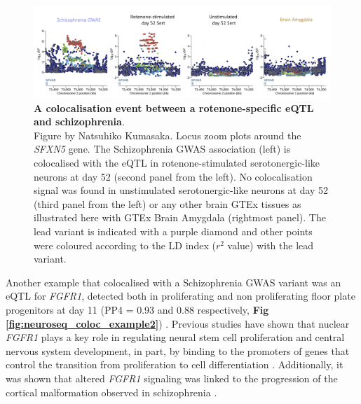 \begin{figure}[h]
\centering
\includegraphics[width=15.5cm]{Chapter5/Fig/neuroseq_coloc_example1_SFXN5.png}
\caption[First example of colocalisation]{\textbf{A colocalisation event between a rotenone-specific eQTL and schizophrenia}.\\
Figure by Natsuhiko Kumasaka. Locus zoom plots around the \textit{SFXN5} gene. 
The Schizophrenia GWAS association (left) is colocalised with the eQTL in rotenone-stimulated serotonergic-like neurons at day 52 (second panel from the left). 
No colocalisation signal was found in unstimulated serotonergic-like neurons at day 52 (third panel from the left) or any other brain GTEx tissues as illustrated here with GTEx Brain Amygdala (rightmost panel). 
The lead variant is indicated with a purple diamond and other points were coloured according to the LD index ($r^2$ value) with the lead variant.}
\label{fig:neuroseq_coloc_example1}
\end{figure}

Another example that colocalised with a Schizophrenia GWAS variant was an eQTL for
\textit{FGFR1}, detected both in proliferating and non proliferating floor plate progenitors at day 11 (PP4 = 0.93 and 0.88 respectively, \textbf{Fig \ref{fig:neuroseq_coloc_example2}}) . 
Previous studies have shown that nuclear \textit{FGFR1} plays a key role in regulating neural stem cell proliferation and central nervous system development, in part, by binding to the promoters of genes that control the transition from proliferation to cell differentiation \cite{ma2009molecular}. 
Additionally, it was shown that altered \textit{FGFR1} signaling was linked to the progression of the cortical malformation observed in schizophrenia \cite{stachowiak2017cerebral}.\\

